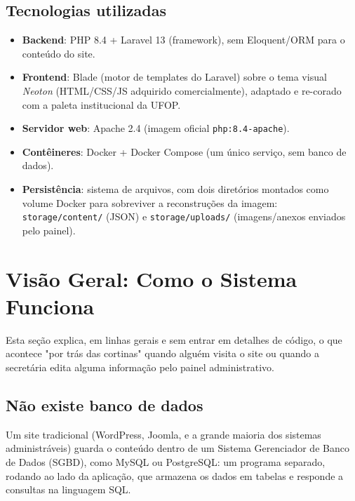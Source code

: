 \documentclass[11pt,a4paper]{article}
\begin{document}
\subsection{Tecnologias utilizadas}

\begin{itemize}[leftmargin=2em]
    \item \textbf{Backend}: PHP 8.4 + Laravel 13 (framework), sem Eloquent/ORM para o conteúdo do site.
    \item \textbf{Frontend}: Blade (motor de templates do Laravel) sobre o tema visual
          \emph{Neoton} (HTML/CSS/JS adquirido comercialmente), adaptado e re-corado com a
          paleta institucional da UFOP.
    \item \textbf{Servidor web}: Apache 2.4 (imagem oficial \texttt{php:8.4-apache}).
    \item \textbf{Contêineres}: Docker + Docker Compose (um único serviço, sem banco de dados).
    \item \textbf{Persistência}: sistema de arquivos, com dois diretórios montados como volume
          Docker para sobreviver a reconstruções da imagem: \texttt{storage/content/} (JSON) e
          \texttt{storage/uploads/} (imagens/anexos enviados pelo painel).
\end{itemize}

\section{Visão Geral: Como o Sistema Funciona}

Esta seção explica, em linhas gerais e sem entrar em detalhes de código, o que acontece "por
trás das cortinas" quando alguém visita o site ou quando a secretária edita alguma informação
pelo painel administrativo.

\subsection{Não existe banco de dados}

Um site tradicional (WordPress, Joomla, e a grande maioria dos sistemas administráveis) guarda
o conteúdo dentro de um Sistema Gerenciador de Banco de Dados (SGBD), como MySQL ou PostgreSQL:
um programa separado, rodando ao lado da aplicação, que armazena os dados em tabelas e responde
a consultas na linguagem SQL.
\end{document}
